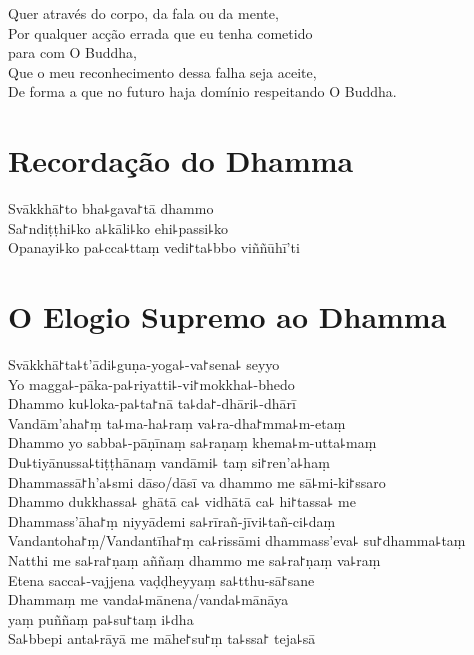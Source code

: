 Quer através do corpo, da fala ou da mente,\\
Por qualquer acção errada que eu tenha cometido\\
\vin para com O Buddha,\\
Que o meu reconhecimento dessa falha seja aceite,\\
De forma a que no futuro haja domínio respeitando O Buddha.

\clearpage

\chapter*{Recordação do Dhamma}

\delegateSetUseNext

\begin{leader}
\end{leader}

Svākkhā꜓to bha꜕gava꜓tā dhammo\\
Sa꜓ndiṭṭhi꜕ko a꜕kāli꜕ko ehi꜕passi꜕ko\\
Opanayi꜕ko pa꜕cca꜕ttaṃ vedi꜓ta꜕bbo viññūhī'ti

\chapter*{O Elogio Supremo ao Dhamma}

\begin{leader}
\end{leader}

Svākkhā꜓ta꜕t'ādi꜕guṇa-yoga꜕-va꜓sena꜕ seyyo\\
Yo magga꜕-pāka-pa꜕riyatti꜕-vi꜓mokkha꜕-bhedo\\
Dhammo ku꜕loka-pa꜕ta꜓nā ta꜕da꜓-dhāri꜕-dhārī\\
Vandām'aha꜓ṃ ta꜕ma-ha꜕raṃ va꜕ra-dha꜓mma꜕m-etaṃ\\
Dhammo yo sabba꜕-pāṇīnaṃ sa꜕raṇaṃ khema꜕m-utta꜕maṃ\\
Du꜕tiyānussa꜕tiṭṭhānaṃ vandāmi꜕ taṃ si꜓ren'a꜕haṃ\\
Dhammassā꜓h'a꜕smi dāso/dāsī va dhammo me sā꜕mi-ki꜓ssaro\\
Dhammo dukkhassa꜕ ghātā ca꜕ vidhātā ca꜕ hi꜓tassa꜕ me\\
Dhammass'āha꜓ṃ niyyādemi sa꜕rīrañ-jīvi꜕tañ-ci꜕daṃ\\
Vandantoha꜓ṃ/Vandantīha꜓ṃ ca꜕rissāmi dhammass'eva꜕ su꜓dhamma꜕taṃ\\
Natthi me sa꜕ra꜓ṇaṃ aññaṃ dhammo me sa꜕ra꜓ṇaṃ va꜕raṃ\\
Etena sacca꜕-vajjena vaḍḍheyyaṃ sa꜕tthu-sā꜓sane\\
Dhammaṃ me vanda꜕mānena/vanda꜕mānāya\\
\vin yaṃ puññaṃ pa꜕su꜓taṃ i꜕dha\\
Sa꜕bbepi anta꜕rāyā me māhe꜓su꜓ṃ ta꜕ssa꜓ teja꜕sā

